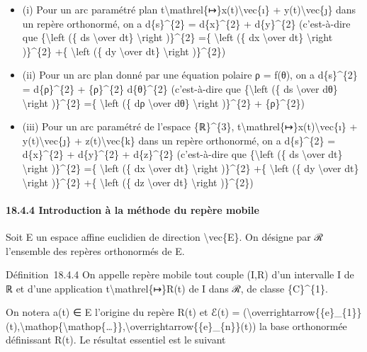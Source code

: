 \documentclass[]{article}
\begin{document}
\begin{itemize}
\itemsep1pt\parskip0pt
\item
  (i) Pour un arc paramétré plan
  t\textbackslash{}mathrel\{↦\}x(t)\textbackslash{}vec\{ı\} +
  y(t)\textbackslash{}vec\{ȷ\} dans un repère orthonormé, on a
  d\{s\}\^{}\{2\} = d\{x\}\^{}\{2\} + d\{y\}\^{}\{2\} (c'est-à-dire que
  \{\textbackslash{}left (\{ ds \textbackslash{}over dt\}
  \textbackslash{}right )\}\^{}\{2\} =\{ \textbackslash{}left (\{ dx
  \textbackslash{}over dt\} \textbackslash{}right )\}\^{}\{2\} +\{
  \textbackslash{}left (\{ dy \textbackslash{}over dt\}
  \textbackslash{}right )\}\^{}\{2\})
\item
  (ii) Pour un arc plan donné par une équation polaire ρ = f(θ), on a
  d\{s\}\^{}\{2\} = d\{ρ\}\^{}\{2\} + \{ρ\}\^{}\{2\} d\{θ\}\^{}\{2\}
  (c'est-à-dire que \{\textbackslash{}left (\{ ds \textbackslash{}over
  dθ\} \textbackslash{}right )\}\^{}\{2\} =\{ \textbackslash{}left (\{
  dρ \textbackslash{}over dθ\} \textbackslash{}right )\}\^{}\{2\} +
  \{ρ\}\^{}\{2\})
\item
  (iii) Pour un arc paramétré de l'espace \{ℝ\}\^{}\{3\},
  t\textbackslash{}mathrel\{↦\}x(t)\textbackslash{}vec\{ı\} +
  y(t)\textbackslash{}vec\{ȷ\} + z(t)\textbackslash{}vec\{k\} dans un
  repère orthonormé, on a d\{s\}\^{}\{2\} = d\{x\}\^{}\{2\} +
  d\{y\}\^{}\{2\} + d\{z\}\^{}\{2\} (c'est-à-dire que
  \{\textbackslash{}left (\{ ds \textbackslash{}over dt\}
  \textbackslash{}right )\}\^{}\{2\} =\{ \textbackslash{}left (\{ dx
  \textbackslash{}over dt\} \textbackslash{}right )\}\^{}\{2\} +\{
  \textbackslash{}left (\{ dy \textbackslash{}over dt\}
  \textbackslash{}right )\}\^{}\{2\} +\{ \textbackslash{}left (\{ dz
  \textbackslash{}over dt\} \textbackslash{}right )\}\^{}\{2\})
\end{itemize}

\paragraph{18.4.4 Introduction à la méthode du repère mobile}

Soit E un espace affine euclidien de direction \textbackslash{}vec\{E\}.
On désigne par ℛ l'ensemble des repères orthonormés de E.

Définition~18.4.4 On appelle repère mobile tout couple (I,R) d'un
intervalle I de ℝ et d'une application t\textbackslash{}mathrel\{↦\}R(t)
de I dans ℛ, de classe \{C\}\^{}\{1\}.

On notera a(t) ∈ E l'origine du repère R(t) et ℰ(t) =
(\textbackslash{}overrightarrow\{\{e\}\_\{1\}\}(t),\textbackslash{}mathop\{\textbackslash{}mathop\{\ldots{}\}\},\textbackslash{}overrightarrow\{\{e\}\_\{n\}\}(t))
la base orthonormée définissant R(t). Le résultat essentiel est le
suivant
\end{document}
